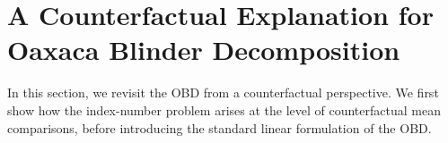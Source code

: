\section{A Counterfactual Explanation for Oaxaca Blinder Decomposition}
\label{sec:counterfactual_OBD}

In this section, we revisit the OBD from a counterfactual perspective. We first show how the index-number problem arises at the level of counterfactual mean comparisons, before introducing the standard linear formulation of the OBD.



